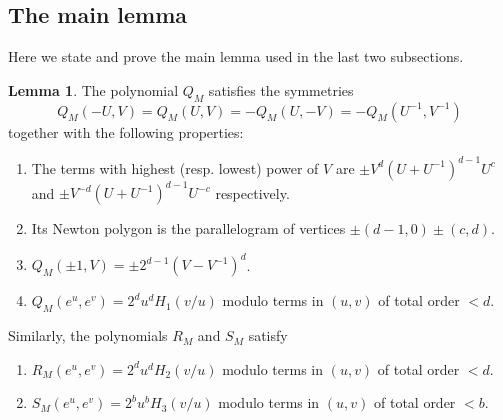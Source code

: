 \documentclass{amsart}
\newcommand{\Z}{\mathbb{Z}}
\theoremstyle{definition}
\newtheorem{Lemma}[Theorem]{Lemma}
\begin{document}
\subsection{The main lemma}
Here we state and prove the main lemma used in the last two subsections. 
\begin{Lemma}\label{Qlemma}
The polynomial $Q_M$ satisfies the symmetries 
$$Q_M(-U,V)=Q_M(U,V)=-Q_M(U,-V)=-Q_M(U^{-1},V^{-1})$$ 
together with the following properties: 
\begin{enumerate}
\item The terms with highest (resp. lowest) power of $V$ are $\pm V^d(U+U^{-1})^{d-1}U^{c}$ and $\pm V^{-d}(U+U^{-1})^{d-1}U^{-c}$ respectively.
\item Its Newton polygon is the parallelogram of vertices $\pm (d-1,0)\pm(c,d)$.
\item $Q_M(\pm 1,V)=\pm 2^{d-1}(V-V^{-1})^d$.
\item $Q_M(e^u,e^v)=2^du^dH_1(v/u)$ modulo terms in $(u,v)$ of total order $<d$. 
\end{enumerate}
Similarly, the polynomials $R_M$ and $S_M$ satisfy
\begin{enumerate}
\item[(5)] $R_M(e^u,e^v)=2^du^dH_2(v/u)$  modulo terms in $(u,v)$ of total order $<d$. 
\item[(6)] $S_M(e^u,e^v)=2^bu^bH_3(v/u)$ modulo terms in $(u,v)$ of total order $<b$.  
\end{enumerate}
\end{Lemma}
\end{document}
